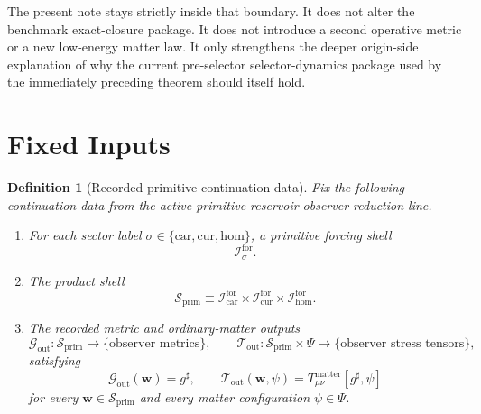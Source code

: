 \documentclass[11pt]{article}
\newcommand{\CompletedMetric}{g^{\sharp}}
\newcommand{\MatterSpace}{\Psi}
\newcommand{\Car}{\mathrm{car}}
\newcommand{\Cur}{\mathrm{cur}}
\newcommand{\Hom}{\mathrm{hom}}
\newcommand{\ForSpace}[1]{\mathcal I_{#1}^{\mathrm{for}}}
\newcommand{\PrimShell}{\mathcal S_{\mathrm{prim}}}
\newcommand{\MetricOut}{\mathscr G_{\mathrm{out}}}
\newcommand{\MatterOut}{\mathscr T_{\mathrm{out}}}
\newtheorem{definition}{Definition}
\begin{document}
The present note stays strictly inside that boundary. It does not alter the benchmark exact-closure package. It does not introduce a second operative metric or a new low-energy matter law. It only strengthens the deeper origin-side explanation of why the current pre-selector selector-dynamics package used by the immediately preceding theorem should itself hold.

\section{Fixed Inputs}

\begin{definition}[Recorded primitive continuation data]
\label{def:fixed}
Fix the following continuation data from the active primitive-reservoir observer-reduction line.
\begin{enumerate}
    \item For each sector label \(\sigma\in\{\Car,\Cur,\Hom\}\), a primitive forcing shell
    \[
    \ForSpace{\sigma}.
    \]
    \item The product shell
    \[
    \PrimShell
    \equiv
    \ForSpace{\Car}\times \ForSpace{\Cur}\times \ForSpace{\Hom}.
    \]
    \item The recorded metric and ordinary-matter outputs
    \[
    \MetricOut:\PrimShell\to\{\text{observer metrics}\},
    \qquad
    \MatterOut:\PrimShell\times\MatterSpace\to\{\text{observer stress tensors}\},
    \]
    satisfying
    \begin{equation}
    \MetricOut(\mathbf w)=\CompletedMetric,
    \qquad
    \MatterOut(\mathbf w,\psi)
    =
    T_{\mu\nu}^{\mathrm{matter}}[\CompletedMetric,\psi]
    \label{eq:fixedoutputs}
    \end{equation}
    for every \(\mathbf w\in\PrimShell\) and every matter configuration \(\psi\in\MatterSpace\).
\end{enumerate}
\end{definition}
\end{document}
